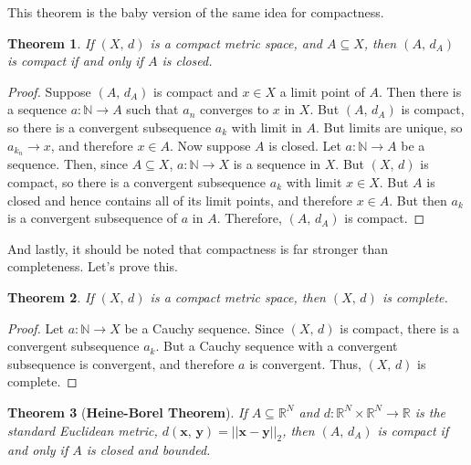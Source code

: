 \documentclass{article}
\theoremstyle{plain}
\newtheorem{theorem}{Theorem}[section]
\theoremstyle{normal}
\begin{document}
        This theorem is the baby version of the same idea for compactness.
        \begin{theorem}
            If $(X,\,d)$ is a compact metric space, and $A\subseteq{X}$, then
            $(A,\,d_{A})$ is compact if and only if $A$ is closed.
        \end{theorem}
        \begin{proof}
            Suppose $(A,\,d_{A})$ is compact and $x\in{X}$ a limit point of
            $A$. Then there is a sequence $a:\mathbb{N}\rightarrow{A}$ such
            that $a_{n}$ converges to $x$ in $X$. But $(A,\,d_{A})$ is compact,
            so there is a convergent subsequence $a_{k}$ with limit in $A$.
            But limits are unique, so $a_{k_{n}}\rightarrow{x}$, and therefore
            $x\in{A}$. Now suppose $A$ is closed. Let
            $a:\mathbb{N}\rightarrow{A}$ be a sequence. Then, since
            $A\subseteq{X}$, $a:\mathbb{N}\rightarrow{X}$ is a sequence in $X$.
            But $(X,\,d)$ is compact, so there is a convergent subsequence
            $a_{k}$ with limit $x\in{X}$. But $A$ is closed and hence contains
            all of its limit points, and therefore $x\in{A}$. But then
            $a_{k}$ is a convergent subsequence of $a$ in $A$. Therefore,
            $(A,\,d_{A})$ is compact.
        \end{proof}
        And lastly, it should be noted that compactness is far stronger than
        completeness. Let's prove this.
        \begin{theorem}
            If $(X,\,d)$ is a compact metric space, then $(X,\,d)$ is complete.
        \end{theorem}
        \begin{proof}
            Let $a:\mathbb{N}\rightarrow{X}$ be a Cauchy sequence. Since
            $(X,\,d)$ is compact, there is a convergent subsequence
            $a_{k}$. But a Cauchy sequence with a convergent subsequence is
            convergent, and therefore $a$ is convergent. Thus, $(X,\,d)$ is
            complete.
        \end{proof}
        \begin{theorem}[\textbf{Heine-Borel Theorem}]
            If $A\subseteq\mathbb{R}^{N}$ and
            $d:\mathbb{R}^{N}\times\mathbb{R}^{N}\rightarrow\mathbb{R}$ is the
            standard Euclidean metric,
            $d(\mathbf{x},\,\mathbf{y})=||\mathbf{x}-\mathbf{y}||_{2}$, then
            $(A,\,d_{A})$ is compact if and only if $A$ is closed and bounded.
        \end{theorem}
\end{document}
